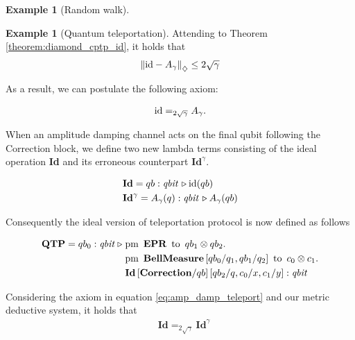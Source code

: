 \documentclass[10pt,a4paper]{amsart}
\theoremstyle{definition}
\theoremstyle{definition}
\newtheorem{example}[definition]{Example}
\theoremstyle{definition}
\theoremstyle{definition}
\theoremstyle{definition}
\theoremstyle{definition}
\begin{document}
\begin{example}[Random walk]
\begin{example}[Quantum teleportation]
Attending to Theorem \ref{theorem:diamond_cptp_id}, it holds that
\begin{align*}
  \left\lVert  \mathrm{id} - A_\gamma \right\rVert_{\diamondsuit} \leq 2 \sqrt{\gamma}
\end{align*}

As a result, we can postulate the following axiom:

    \begin{align} \label{eq:amp_damp_teleport}
        \mathrm{id} =_{2 \sqrt{\gamma}} A_\gamma.
    \end{align}


When an amplitude damping channel acts on the final qubit following the Correction block, we define two new lambda terms consisting of the ideal operation \textbf{Id} and its erroneous counterpart  $\textbf{Id}^{\gamma}$.

\begin{align}\label{eq:id_error_teleport}
  &\textbf{Id} = qb:\textit{qbit} \, \triangleright \mathrm{id} (qb) \\
  & \textbf{Id}^{\gamma} = A_{\gamma} (q):\textit{qbit} \, \triangleright  A_{\gamma} (qb)
\end{align}


Consequently the ideal version of teleportation protocol is now defined as follows

\begin{align*} 
  \textbf{QTP} = qb_{0}: \textit{qbit}\hspace{3 pt} \triangleright \hspace{3 pt} & \text{pm} \hspace{5pt} \textbf{EPR} \hspace{5pt} \text{to} \hspace{5pt}  qb_{1} \otimes qb_{2}.  \notag \\
     & \text{pm}\hspace{5pt} \textbf{BellMeasure}\, [qb_0/q_1,qb_{1}/q_2] \hspace{5pt}  \text{to} \hspace{5pt} c_{0}\otimes c_{1} . \notag \\
     & \textbf{Id} \, [ \textbf{Correction}/qb] \, [qb_{2}/q,c_{0}/x, c_{1}/y] 
     : \emph{qbit}  
 \end{align*}

 Considering the axiom in equation \eqref{eq:amp_damp_teleport} and our metric deductive system, it holds that 
\begin{align*}
  &\textbf{Id}=_{2 \sqrt{\gamma}} \textbf{Id}^{\gamma}
\end{align*}


\end{example}
\end{example}
\end{document}
